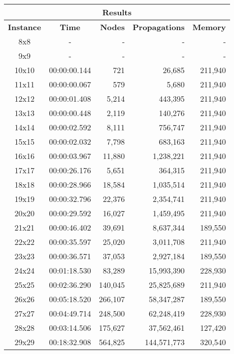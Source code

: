 
\begin{center}
    \begin{tabular}{|c|c|r|r|r|}
        \hline
        \multicolumn{5}{|c|}{\textbf{Results}} \\
        \hline
        \textbf{Instance} & \textbf{Time} & \textbf{Nodes} & \textbf{Propagations} & \textbf{Memory} \\
        
        \hline
		8x8 & - & - & - & - \\ \hline
		9x9 & - & - & - & - \\ \hline
		10x10 & 00:00:00.144 & 721 & 26,685 & 211,940 \\ \hline
		11x11 & 00:00:00.067 & 579 & 5,680 & 211,940 \\ \hline
		12x12 & 00:00:01.408 & 5,214 & 443,395 & 211,940 \\ \hline
		13x13 & 00:00:00.448 & 2,119 & 140,276 & 211,940 \\ \hline
		14x14 & 00:00:02.592 & 8,111 & 756,747 & 211,940 \\ \hline
		15x15 & 00:00:02.032 & 7,798 & 683,163 & 211,940 \\ \hline
		16x16 & 00:00:03.967 & 11,880 & 1,238,221 & 211,940 \\ \hline
		17x17 & 00:00:26.176 & 5,651 & 364,315 & 211,940 \\ \hline
		18x18 & 00:00:28.966 & 18,584 & 1,035,514 & 211,940 \\ \hline
		19x19 & 00:00:32.796 & 22,376 & 2,354,741 & 211,940 \\ \hline
		20x20 & 00:00:29.592 & 16,027 & 1,459,495 & 211,940 \\ \hline
		21x21 & 00:00:46.402 & 39,691 & 8,637,344 & 189,550 \\ \hline
		22x22 & 00:00:35.597 & 25,020 & 3,011,708 & 211,940 \\ \hline
		23x23 & 00:00:36.571 & 37,053 & 2,927,184 & 189,550 \\ \hline
		24x24 & 00:01:18.530 & 83,289 & 15,993,390 & 228,930 \\ \hline
		25x25 & 00:02:36.290 & 140,045 & 25,825,689 & 211,940 \\ \hline
		26x26 & 00:05:18.520 & 266,107 & 58,347,287 & 189,550 \\ \hline
		27x27 & 00:04:49.714 & 248,500 & 62,248,419 & 228,930 \\ \hline
		28x28 & 00:03:14.506 & 175,627 & 37,562,461 & 127,420 \\ \hline
		29x29 & 00:18:32.908 & 564,825 & 144,571,773 & 320,540 \\ \hline

\end{tabular}
\end{center}
